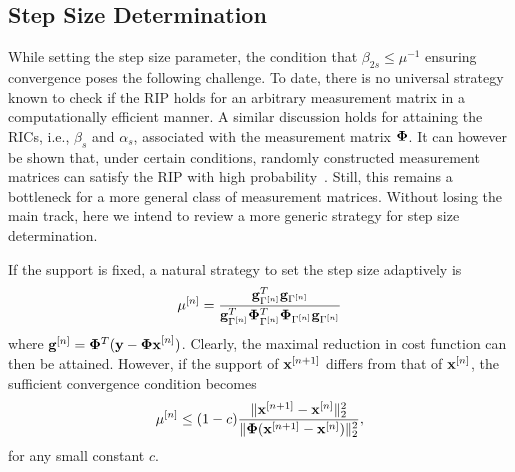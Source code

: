 \documentclass{article}
\begin{document}
\subsection{Step Size Determination} 
\vspace{-.5em}
While setting the step size parameter, the condition that $\beta_{2s}\leq\mu^{-1}$ ensuring convergence poses the following challenge. To date, there is no universal strategy known to check if the RIP holds for an arbitrary measurement matrix in a computationally efficient manner. A similar discussion holds for attaining the RICs, i.e., ${\beta_s}$ and $\alpha_s$, associated with the measurement matrix ${\bf \Phi}$. It can however be shown that, under certain conditions, randomly constructed measurement matrices can satisfy
the RIP with high probability~\cite{candes2008rip, chartrand2008rip}. Still, this remains a bottleneck for a more general class of
measurement matrices. Without losing the main track, here we intend to review a more generic strategy for step size determination. 

If the support is fixed, a natural strategy to set the step size adaptively is~\cite{blumensath2010niht}
\begin{equation}\label{step_size}
   \mu^{[n]} = \frac{{\bf g}^T_{\Gamma^{[n]}}{\bf g}_{\Gamma^{[n]}}}{{\bf g}^T_{\Gamma^{[n]}}{\bf \Phi}^T_{\Gamma^{[n]}}{\bf \Phi}_{\Gamma^{[n]}}{\bf g}_{\Gamma^{[n]}}}
\end{equation}
where ${\bf g}^{[n]} = {\bf \Phi}^T({\bf y}-{\bf \Phi x}^{[n]})$. Clearly, the maximal reduction in cost function can then be attained. However, if the support of ${\bf x}^{[n+1]}$ differs from that of ${\bf x}^{[n]}$, the sufficient convergence condition  becomes
\begin{equation}
    \mu^{[n]} \leq(1-c) \frac{\|{\bf x}^{[n+1]}-{\bf x}^{[n]} \|_2^2}{\|{\bf \Phi}({\bf x}^{[n+1]}-{\bf x}^{[n]}) \|_2^2},
\end{equation}
for any small constant $c$.
\end{document}
